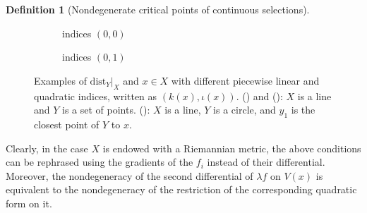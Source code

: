 \documentclass{amsart}
\newcommand{\dist}{{\mathrm{dist}_Y|_X}}
\def\lini{k}
\def\quadi{\iota}
\theoremstyle{definition}
\newtheorem{definition}[subsubsection]{Definition}
\theoremstyle{remark}
\begin{document}
\begin{definition}[Nondegenerate critical points of continuous selections]
\begin{figure}
\begin{subfigure}{.3\textwidth}
\caption{indices $(0, 0)$}
\label{F:sub-00}
\end{subfigure}
\begin{subfigure}{.3\textwidth}
\centering
{}
\caption{indices $(0, 1)$}
\label{F:sub-01}
\end{subfigure}
\caption{Examples of $\dist$ and $x \in X$ with different piecewise linear and quadratic indices, written as $(\lini(x), \quadi(x))$. () and (): $X$ is a line and $Y$ is a set of points. (): $X$ is a line, $Y$ is a circle, and $y_1$ is the closest point of $Y$ to $x$.}
\label{F:indices}
\end{figure}


Clearly, in the case $X$ is endowed with a Riemannian metric, the above conditions can be rephrased using the gradients of the $f_i$ instead of their differential. Moreover, the nondegeneracy of the second differential of $\lambda f$ on $V(x)$ is equivalent to the nondegeneracy of the restriction of the corresponding quadratic form on it.
\end{definition}
\end{document}
